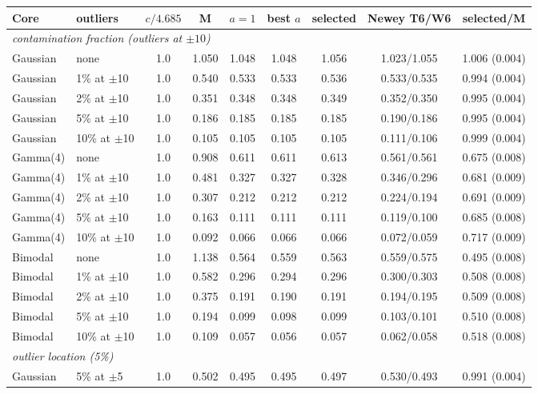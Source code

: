 \begin{tabular}{llccccccc}
\toprule
Core & outliers & $c/4.685$ & M & $a=1$ & best $a$ & selected & Newey T6/W6 & selected/M \\
\midrule
\multicolumn{9}{l}{\emph{contamination fraction (outliers at $\pm10$)}} \\
Gaussian & none & 1.0 & 1.050 & 1.048 & 1.048 & 1.056 & 1.023/1.055 & 1.006 (0.004) \\
Gaussian & 1\% at $\pm$10 & 1.0 & 0.540 & 0.533 & 0.533 & 0.536 & 0.533/0.535 & 0.994 (0.004) \\
Gaussian & 2\% at $\pm$10 & 1.0 & 0.351 & 0.348 & 0.348 & 0.349 & 0.352/0.350 & 0.995 (0.004) \\
Gaussian & 5\% at $\pm$10 & 1.0 & 0.186 & 0.185 & 0.185 & 0.185 & 0.190/0.186 & 0.995 (0.004) \\
Gaussian & 10\% at $\pm$10 & 1.0 & 0.105 & 0.105 & 0.105 & 0.105 & 0.111/0.106 & 0.999 (0.004) \\
Gamma(4) & none & 1.0 & 0.908 & 0.611 & 0.611 & 0.613 & 0.561/0.561 & 0.675 (0.008) \\
Gamma(4) & 1\% at $\pm$10 & 1.0 & 0.481 & 0.327 & 0.327 & 0.328 & 0.346/0.296 & 0.681 (0.009) \\
Gamma(4) & 2\% at $\pm$10 & 1.0 & 0.307 & 0.212 & 0.212 & 0.212 & 0.224/0.194 & 0.691 (0.009) \\
Gamma(4) & 5\% at $\pm$10 & 1.0 & 0.163 & 0.111 & 0.111 & 0.111 & 0.119/0.100 & 0.685 (0.008) \\
Gamma(4) & 10\% at $\pm$10 & 1.0 & 0.092 & 0.066 & 0.066 & 0.066 & 0.072/0.059 & 0.717 (0.009) \\
Bimodal & none & 1.0 & 1.138 & 0.564 & 0.559 & 0.563 & 0.559/0.575 & 0.495 (0.008) \\
Bimodal & 1\% at $\pm$10 & 1.0 & 0.582 & 0.296 & 0.294 & 0.296 & 0.300/0.303 & 0.508 (0.008) \\
Bimodal & 2\% at $\pm$10 & 1.0 & 0.375 & 0.191 & 0.190 & 0.191 & 0.194/0.195 & 0.509 (0.008) \\
Bimodal & 5\% at $\pm$10 & 1.0 & 0.194 & 0.099 & 0.098 & 0.099 & 0.103/0.101 & 0.510 (0.008) \\
Bimodal & 10\% at $\pm$10 & 1.0 & 0.109 & 0.057 & 0.056 & 0.057 & 0.062/0.058 & 0.518 (0.008) \\
\multicolumn{9}{l}{\emph{outlier location (5\%)}} \\
Gaussian & 5\% at $\pm$5 & 1.0 & 0.502 & 0.495 & 0.495 & 0.497 & 0.530/0.493 & 0.991 (0.004) \\

\end{tabular}
